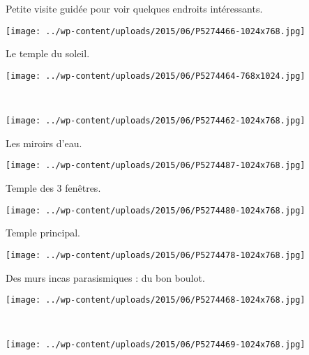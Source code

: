 Petite visite guidée pour voir quelques endroits intéressants.
\begin{center} \texttt{[image: ../wp-content/uploads/2015/06/P5274466-1024x768.jpg]} \end{center}

Le temple du soleil. 
\begin{center} \texttt{[image: ../wp-content/uploads/2015/06/P5274464-768x1024.jpg]} \end{center}
\vspace{-\topsep}
\pagebreak
~
\vspace{-11mm}
\begin{center} \texttt{[image: ../wp-content/uploads/2015/06/P5274462-1024x768.jpg]} \end{center}

Les miroirs d'eau. 
\begin{center} \texttt{[image: ../wp-content/uploads/2015/06/P5274487-1024x768.jpg]} \end{center}
\vspace{-\topsep}
\pagebreak

Temple des 3 fenêtres. 
\begin{center} \texttt{[image: ../wp-content/uploads/2015/06/P5274480-1024x768.jpg]} \end{center}

Temple principal. 
\begin{center} \texttt{[image: ../wp-content/uploads/2015/06/P5274478-1024x768.jpg]} \end{center}
\vspace{-\topsep}
\pagebreak

Des murs incas parasismiques : du bon boulot. 
\begin{center} \texttt{[image: ../wp-content/uploads/2015/06/P5274468-1024x768.jpg]} \end{center}
~
\begin{center} \texttt{[image: ../wp-content/uploads/2015/06/P5274469-1024x768.jpg]} \end{center}
\vspace{-\topsep}
\pagebreak

